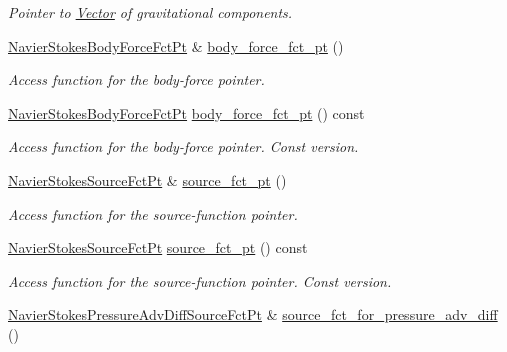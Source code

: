 \begin{DoxyCompactItemize}
\begin{DoxyCompactList}\small\item\em Pointer to \hyperlink{classoomph_1_1Vector}{Vector} of gravitational components. \end{DoxyCompactList}\item 
\hyperlink{classoomph_1_1NavierStokesEquations_a01443cdc37d9aa9d7644c79212108842}{Navier\+Stokes\+Body\+Force\+Fct\+Pt} \& \hyperlink{classoomph_1_1NavierStokesEquations_a944d3c1539a3f1d0f272bda993f91c3a}{body\+\_\+force\+\_\+fct\+\_\+pt} ()
\begin{DoxyCompactList}\small\item\em Access function for the body-\/force pointer. \end{DoxyCompactList}\item 
\hyperlink{classoomph_1_1NavierStokesEquations_a01443cdc37d9aa9d7644c79212108842}{Navier\+Stokes\+Body\+Force\+Fct\+Pt} \hyperlink{classoomph_1_1NavierStokesEquations_a2a3badc58671a1c914ebc71df300c471}{body\+\_\+force\+\_\+fct\+\_\+pt} () const
\begin{DoxyCompactList}\small\item\em Access function for the body-\/force pointer. Const version. \end{DoxyCompactList}\item 
\hyperlink{classoomph_1_1NavierStokesEquations_a1d69b671e6d4c0e75a02d6fa3dab478f}{Navier\+Stokes\+Source\+Fct\+Pt} \& \hyperlink{classoomph_1_1NavierStokesEquations_a1efac502596fb166779454eba5d0ca64}{source\+\_\+fct\+\_\+pt} ()
\begin{DoxyCompactList}\small\item\em Access function for the source-\/function pointer. \end{DoxyCompactList}\item 
\hyperlink{classoomph_1_1NavierStokesEquations_a1d69b671e6d4c0e75a02d6fa3dab478f}{Navier\+Stokes\+Source\+Fct\+Pt} \hyperlink{classoomph_1_1NavierStokesEquations_aa3cded93d6d40ad4b4fa8382db0b9979}{source\+\_\+fct\+\_\+pt} () const
\begin{DoxyCompactList}\small\item\em Access function for the source-\/function pointer. Const version. \end{DoxyCompactList}\item 
\hyperlink{classoomph_1_1NavierStokesEquations_ae97e12328a88431038ccb321ee6d0c73}{Navier\+Stokes\+Pressure\+Adv\+Diff\+Source\+Fct\+Pt} \& \hyperlink{classoomph_1_1NavierStokesEquations_a72e10915163058537f96563450734104}{source\+\_\+fct\+\_\+for\+\_\+pressure\+\_\+adv\+\_\+diff} ()

\end{DoxyCompactItemize}
